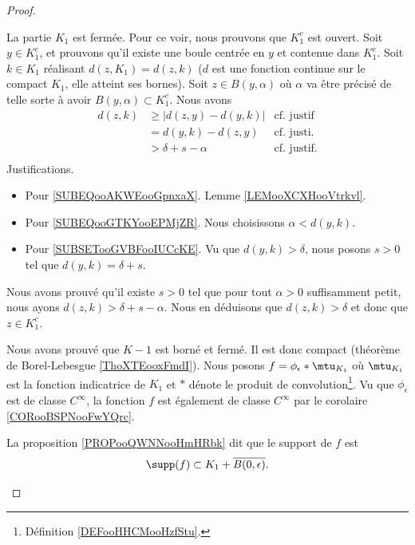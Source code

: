 \begin{proof}
\begin{subproof}
		La partie \( K_1\) est fermée. Pour ce voir, nous prouvons que \( K_1^c\) est ouvert. Soit \( y\in K_1^c\), et prouvons qu'il existe une boule centrée en \( y\) et contenue dans \( K_1^c\). Soit \( k\in K_1\) réalisant \( d(z,K_1)=d(z,k)\) (\( d\) est une fonction continue sur le compact \( K_1\), elle atteint ses bornes). Soit \( z\in B(y,\alpha)\) où \( \alpha\) va être précisé de telle sorte à avoir \( B(y,\alpha)\subset K_1^c\). Nous avons
		\begin{subequations}
			\begin{align}
				d(z,k) & \geq | d(z,y)-d(y,k) | & \text{cf. justif}		\label{SUBEQooAKWEooGpnxaX} \\
				       & =d(y,k)-d(z,y)         & \text{cf. justi.}	\label{SUBEQooGTKYooEPMjZR}  \\
				       & > \delta+s-\alpha      & \text{cf. justif.}\label{SUBSETooGVBFooIUCcKE} \\
			\end{align}
		\end{subequations}
		Justifications.
		\begin{itemize}
			\item Pour \eqref{SUBEQooAKWEooGpnxaX}. Lemme \ref{LEMooXCXHooVtrkvl}.
			\item Pour \eqref{SUBEQooGTKYooEPMjZR}. Nous choisissons \( \alpha<d(y,k)\).
			\item Pour \ref{SUBSETooGVBFooIUCcKE}. Vu que \( d(y,k)>\delta\), nous posons \( s>0\) tel que \( d(y,k)=\delta+s\).
		\end{itemize}
		Nous avons prouvé qu'il existe \( s>0\) tel que pour tout \( \alpha>0\) suffisamment petit, nous ayons \( d(z,k)>\delta+s-\alpha\). Nous en déduisons que \( d(z,k)>\delta\) et donc que \( z\in K_1^c\).

		Nous avons prouvé que \( K-1\) est borné et fermé. Il est donc compact (théorème de Borel-Lebesgue \ref{ThoXTEooxFmdI}).
		\spitem[La fonction \( f\)]
		Nous posons \( f=\phi_{\epsilon}*\mtu_{K_1}\) où \( \mtu_{K_1}\) est la fonction indicatrice de \( K_1\) et \( *\) dénote le produit de convolution\footnote{Définition \ref{DEFooHHCMooHzfStu}.}. Vu que \( \phi_{\epsilon}\) est de classe \( C^{\infty}\), la fonction \( f\) est également de classe \( C^{\infty}\) par le corolaire \ref{CORooBSPNooFwYQrc}.

		La proposition \ref{PROPooQWNNooHmHRbk} dit que le support de \( f\) est
		\begin{equation}
			\supp(f)\subset K_1+\overline{B(0,\epsilon)}.
		\end{equation}


\end{subproof}
\end{proof}
